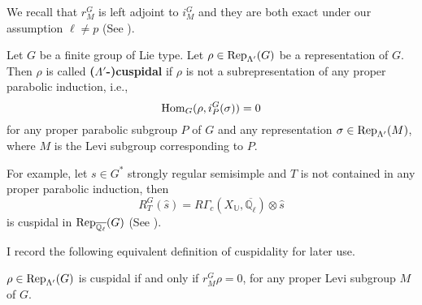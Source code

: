 	We recall that $r_M^G$ is left adjoint to $i_M^G$ and they are both exact under our assumption $\ell \neq p$ (See \cite[II.2.1]{vigneras1996representations}).
	
	\begin{definition}[Cuspidal]\label{Def Cuspidal}
		Let $G$ be a finite group of Lie type. Let $\rho \in \operatorname{\operatorname{Rep}}_{\Lambda'}(G)$ be a representation of $G$. Then $\rho$ is called \textbf{($\Lambda'$-)cuspidal} if $\rho$ is not a subrepresentation of any proper parabolic induction, i.e., 
		$$\operatorname{\operatorname{Hom}}_{G}(\rho, i_P^G(\sigma))=0$$ 
		for any proper parabolic subgroup $P$ of $G$ and any representation $\sigma \in \operatorname{\operatorname{Rep}}_{\Lambda'}(M)$, where $M$ is the Levi subgroup corresponding to $P$.
	\end{definition}
	
	For example, let $s \in G^*$ strongly regular semisimple and $T$ is not contained in any proper parabolic induction, then 
	$$R_T^G(\hat{s})=R\Gamma_c(X_{\mathbb{U}}, \overline{\mathbb{Q}_\ell})\otimes \hat{s}$$ 
	is cuspidal in $\operatorname{\operatorname{Rep}}_{\overline{\mathbb{Q}_{\ell}}}(G)$ (See \cite[Theorem 8.3]{deligne1976representations}). 
	
	I record the following equivalent definition of cuspidality for later use.
	
	\begin{lemma}\cite[II.2.3]{vigneras1996representations}\label{Lemma Cuspidal}
		$\rho \in \operatorname{\operatorname{Rep}}_{\Lambda'}(G)$ is cuspidal if and only if $r_M^G\rho=0$, for any proper Levi subgroup $M$ of $G$.
	\end{lemma}
	
%	
	
	

